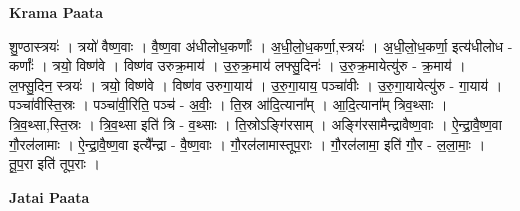 \documentclass[17pt]{extarticle}
\begin{document}
\textbf{Krama Paata} \newline

शु॒ण्ठास्त्रयः॑ । त्रयो॑ वैष्ण॒वाः । वै॒ष्ण॒वा अ॑धीलोध॒कर्णाः᳚ । अ॒धी॒लो॒ध॒कर्णा॒,स्त्रयः॑ । अ॒धी॒लो॒ध॒कर्णा॒ इत्य॑धीलोध - कर्णाः᳚ । त्रयो॒ विष्ण॑वे । विष्ण॑व उरुक्र॒माय॑ । उ॒रु॒क्र॒माय॑ लफ्सु॒दिनः॑ । उ॒रु॒क्र॒मायेत्यु॑रु - क्र॒माय॑ । ल॒फ्सु॒दिन॒ स्त्रयः॑ । त्रयो॒ विष्ण॑वे । विष्ण॑व उरुगा॒याय॑ । उ॒रु॒गा॒याय॒ पञ्चा॑वीः । उ॒रु॒गा॒यायेत्यु॑रु - गा॒याय॑ । पञ्चा॑वीस्ति॒स्रः । पञ्चा॑वी॒रिति॒ पञ्च॑ - अ॒वीः॒ । ति॒स्र आ॑दि॒त्याना᳚म् । आ॒दि॒त्याना᳚म् त्रिव॒थ्साः । त्रि॒व॒थ्सा,स्ति॒स्रः । त्रि॒व॒थ्सा इति॑ त्रि - व॒थ्साः । ति॒स्रोऽङ्गि॑रसाम् । अङ्गि॑रसामैन्द्रावैष्ण॒वाः । ऐ॒न्द्रा॒वै॒ष्ण॒वा गौ॒रल॑लामाः । ऐ॒न्द्रा॒वै॒ष्ण॒वा इत्यै᳚न्द्रा - वै॒ष्ण॒वाः । गौ॒रल॑लामास्तूप॒राः । गौ॒रल॑लामा॒ इति॑ गौ॒र - ल॒ला॒माः॒ । तू॒प॒रा इति॑ तूप॒राः । \newline

\textbf{Jatai Paata} \newline
\end{document}
